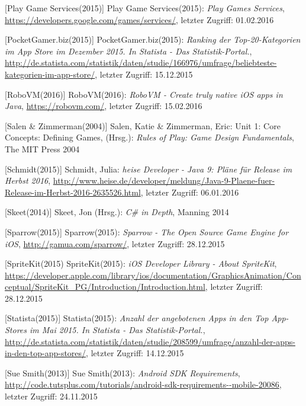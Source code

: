\begin{thebibliography}{}
[Play Game Services(2015)] Play Game Services(2015): \emph{Play Games Services},
\url{https://developers.google.com/games/services/}, letzter Zugriff: 01.02.2016

[PocketGamer.biz(2015)] PocketGamer.biz(2015): \emph{Ranking der Top-20-Kategorien im App Store im Dezember 2015. In Statista - Das Statistik-Portal.},
\url{http://de.statista.com/statistik/daten/studie/166976/umfrage/beliebteste-kategorien-im-app-store/}, letzter Zugriff: 15.12.2015

[RoboVM(2016)] RoboVM(2016): \emph{RoboVM - Create truly native iOS apps in Java},
\url{https://robovm.com/}, letzter Zugriff: 15.02.2016

[Salen \& Zimmerman(2004)] Salen, Katie \& Zimmerman, Eric: 
\glqq Unit 1: Core Concepts: Defining Games\grqq, 
(Hrsg.): \emph{Rules of Play: Game Design Fundamentals}, The MIT Press 2004

[Schmidt(2015)] Schmidt, Julia: \emph{heise Developer - Java 9: Pläne für Release im Herbst 2016},
\url{http://www.heise.de/developer/meldung/Java-9-Plaene-fuer-Release-im-Herbst-2016-2635526.html}, letzter Zugriff: 06.01.2016

[Skeet(2014)] Skeet, Jon (Hrsg.): 
\emph{C\# in Depth}, Manning 2014

[Sparrow(2015)] Sparrow(2015): \emph{Sparrow - The Open Source Game Engine for iOS},
\url{http://gamua.com/sparrow/}, letzter Zugriff: 28.12.2015

[SpriteKit(2015) SpriteKit(2015): \emph{iOS Developer Library - About SpriteKit},
\url{https://developer.apple.com/library/ios/documentation/GraphicsAnimation/Conceptual/SpriteKit_PG/Introduction/Introduction.html}, letzter Zugriff: 28.12.2015

[Statista(2015)] Statista(2015): \emph{Anzahl der angebotenen Apps in den Top App-Stores im Mai 2015. In Statista - Das Statistik-Portal.},
\url{http://de.statista.com/statistik/daten/studie/208599/umfrage/anzahl-der-apps-in-den-top-app-stores/}, letzter Zugriff: 14.12.2015

[Sue Smith(2013)] Sue Smith(2013): \emph{Android SDK Requirements},
\url{http://code.tutsplus.com/tutorials/android-sdk-requirements--mobile-20086}, letzter Zugriff: 24.11.2015


\end{thebibliography}
